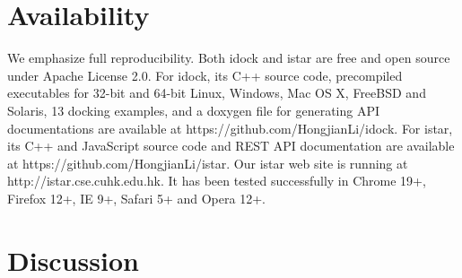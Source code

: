 \documentclass[10pt]{article}
\begin{document}

\section*{Availability}
We emphasize full reproducibility. Both idock and istar are free and open source under Apache License 2.0. For idock, its C++ source code, precompiled executables for 32-bit and 64-bit Linux, Windows, Mac OS X, FreeBSD and Solaris, 13 docking examples, and a doxygen file for generating API documentations are available at https://github.com/HongjianLi/idock. For istar, its C++ and JavaScript source code and REST API documentation are available at https://github.com/HongjianLi/istar. Our istar web site is running at http://istar.cse.cuhk.edu.hk. It has been tested successfully in Chrome 19+, Firefox 12+, IE 9+, Safari 5+ and Opera 12+.

\section*{Discussion}
\end{document}
